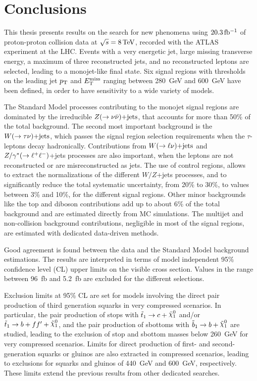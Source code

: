 \chapter{Conclusions}
    \label{chapter:conclusions}

This thesis presents results on the search for new phenomena using $\unit[20.3]{fb^{-1}}$ of proton-proton collision data at $\sqrt{s} = \unit[8]{TeV}$, recorded with the ATLAS experiment at the LHC.
Events with a very energetic jet, large missing transverse energy, a maximum of three reconstructed jets, and no reconstructed leptons are selected, leading to a monojet-like final state.
Six signal regions with thresholds on the leading jet $p_{\mathrm{T}}$ and $E_{\mathrm{T}}^{\mathrm{miss}}$ ranging between 280~GeV and 600~GeV have been defined, in order to have sensitivity to a wide variety of models.

The Standard Model processes contributing to the monojet signal regions are dominated by the irreducible $Z(\rightarrow \nu \bar{\nu})\text{+jets}$, that accounts for more than 50\% of the total background.
The second most important background is the $W(\rightarrow \tau \nu)\text{+jets}$, which passes the signal region selection requirements when the $\tau$-leptons decay hadronically.
Contributions from $W(\rightarrow \ell \nu)\text{+jets}$ and $Z/\gamma^*(\rightarrow\ell^+\ell^-)$+jets processes are also important, when the leptons are not reconstructed or are misreconstructed as jets.
The use of control regions, allows to extract the normalizations of the different $W/Z$+jets processes, and to significantly reduce the total systematic uncertainty, from 20\% to 30\%, to values between 3\% and 10\%, for the different signal regions.
Other minor backgrounds like the top and diboson contributions add up to about 6\% of the total background and are estimated directly from MC simulations.
The multijet and non-collision background contributions, negligible in most of the signal regions, are estimated with dedicated data-driven methods.

Good agreement is found between the data and the Standard Model background estimations.
The results are interpreted in terms of model independent 95\% confidence level (CL) upper limits on the visible cross section.
Values in the range between 96~fb and 5.2~fb are excluded for the different selections.

Exclusion limits at 95\% CL are set for models involving the direct pair production of third generation squarks in very compressed scenarios.
In particular, the pair production of stops with $\stoptocharm$ and/or $\stopfourbody$, and the pair production of sbottoms with $\sbottomtob$ are studied, leading to the exclusion of stop and sbottom masses below 260~GeV for very compressed scenarios.
Limits for direct production of first- and second-generation squarks or gluinos are also extracted in compressed scenarios, leading to exclusions for squarks and gluinos of 440~GeV and 600~GeV, respectively.
These limits extend the previous results from other dedicated searches.

